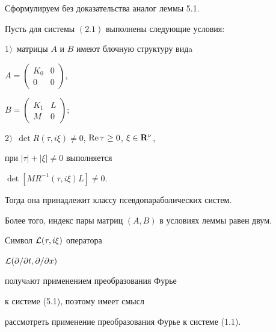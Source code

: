 Сформулируем без доказательства аналог леммы 5.1.





\begin{lems}


Пусть для системы $(2.1)$ выполнены следующие условия\/${:}$


$1)$~матрицы $A$ и $B$ имеют блочную структуру видa


$A=\left( \begin{smallmatrix}K_0 & 0 \\ 0 & 0\end{smallmatrix}\right)$,


$B=\left( \begin{smallmatrix}K_1 & L \\ M & 0\end{smallmatrix}\right);$


$2)$~$\det R(\tau ,i\xi)\ne0$, $\operatorname{Re} \tau\geq0$, $\xi\in {\bold R}^{\nu }$,


при $|\tau | +| \xi | \ne0$ выполняется


$\det[MR^{-1}(\tau ,i\xi)L]\ne0$.


Тогда она принадлежит классу псевдопараболических систем.


Более того, индекс пары матриц $(A,B)$ в условиях леммы равен двум.


\end{lems}





Символ ${\cal L}(\tau, i\xi)$ оператора


${\cal L}(\partial /\partial t,\partial /\partial x)$


получaют применением преобразования Фурье


к системе (5.1), поэтому имеет смысл


рассмотреть применение преобразования Фурье к системе (1.1).





